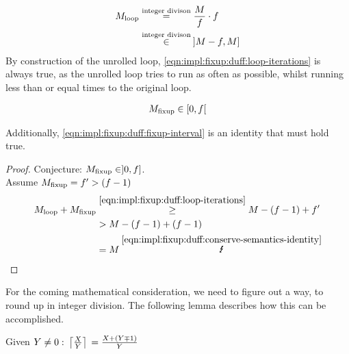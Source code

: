 \begin{equation}\label{eqn:impl:fixup:duff:loop-iterations}
\begin{aligned}
    M_{\text{loop}} &\overset{\text{integer divison}}{=} \frac{M}{f} \cdot f\\
    &\overset{\text{integer divison}}{\in} \medspace \rbrack M-f,M \rbrack
\end{aligned}
\end{equation}
By construction of the unrolled loop, \cref{eqn:impl:fixup:duff:loop-iterations} is always true, as the unrolled loop tries to run as often as possible, whilst running less than or equal times to the original loop.

\begin{equation}\label{eqn:impl:fixup:duff:fixup-interval}
\begin{aligned}
    M_{\text{fixup}} \in \lbrack0, f\lbrack
\end{aligned}
\end{equation}

Additionally, \cref{eqn:impl:fixup:duff:fixup-interval} is an identity that must hold true.
\begin{proof}\label{proof:impl:fixup:duff:fixup-interval}
Conjecture: $M_{\text{fixup}} \in \rbrack 0,  f \rbrack$.\\

Assume $M_{\text{fixup}} = f' > (f - 1)$
\begin{align*}
    \Mloop + \Mfixup &\overset{\ref{eqn:impl:fixup:duff:loop-iterations}}{\geq} M - (f - 1) + f' \\
    &> M - (f - 1) + (f - 1) \\
    &= M \medspace \overset{\ref{eqn:impl:fixup:duff:conserve-semantics-identity}}{\mLightning}
\end{align*}
\end{proof}

For the coming mathematical consideration, we need to figure out a way, to round up in integer division.
The following lemma describes how this can be accomplished.
\begin{lem}\label{lem:impl:fixup:duff:ceil-mp}
    Given $Y \neq 0: \medspace \left\lceil{}\frac{X}{Y}\right\rceil{} = \frac{X + (Y \mp 1)}{Y}$
\end{lem}

